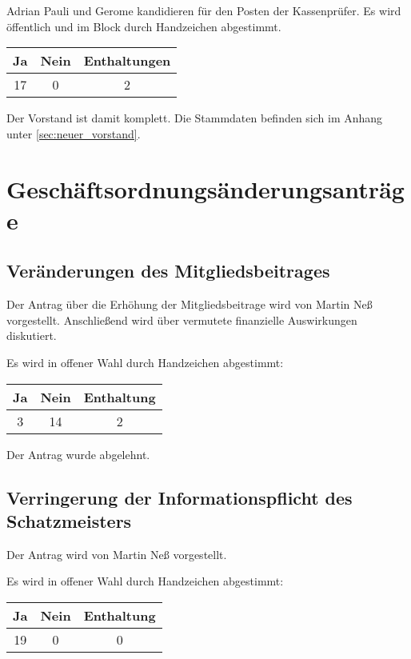 \documentclass{scrartcl}
\begin{document}
Adrian Pauli und Gerome kandidieren für den Posten der %
Kassenprüfer. Es wird öffentlich und im Block durch Handzeichen abgestimmt.

\begin{table}[h!]
    \centering
    \begin{tabular}{c|c|c}
        \textbf{Ja}& \textbf{Nein} & \textbf{Enthaltungen} \\ \hline
        17 & 0 & 2
    \end{tabular}
\end{table}

Der Vorstand ist damit komplett. Die Stammdaten befinden sich im Anhang unter \ref{sec:neuer_vorstand}.

\section{Geschäftsordnungsänderungsanträge}
\subsection{Veränderungen des Mitgliedsbeitrages}
Der Antrag über die Erhöhung der Mitgliedsbeitrage wird von Martin Neß vorgestellt.
Anschließend wird über vermutete finanzielle Auswirkungen diskutiert.

Es wird in offener Wahl durch Handzeichen abgestimmt:

\begin{table}[h!]
    \centering
    \begin{tabular}{c|c|c}
        \textbf{Ja} & \textbf{Nein} & \textbf{Enthaltung} \\ \hline
        3 & 14 & 2
    \end{tabular}
\end{table}

Der Antrag wurde abgelehnt.

\subsection{Verringerung der Informationspflicht des Schatzmeisters}
Der Antrag wird von Martin Neß vorgestellt.

Es wird in offener Wahl durch Handzeichen abgestimmt:

\begin{table}[h!]
    \centering
    \begin{tabular}{c|c|c}
        \textbf{Ja} & \textbf{Nein} & \textbf{Enthaltung} \\ \hline
        19 & 0 & 0
    \end{tabular}
\end{table}
\end{document}
